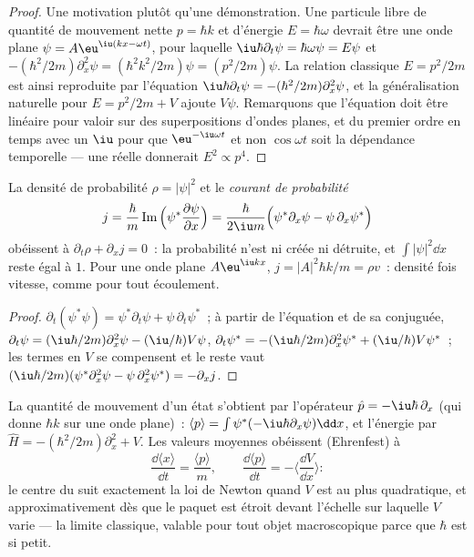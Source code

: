 \begin{proof}
Une motivation plutôt qu'une démonstration. Une particule libre de quantité de mouvement nette
$p = \hbar k$ et d'énergie $E = \hbar\omega$ devrait être une onde plane $\psi =
A\eu^{\iu(kx - \omega t)}$, pour laquelle $\iu\hbar\partial_t\psi = \hbar\omega\psi =
E\psi$ et $-(\hbar^2/2m)\partial_x^2\psi = (\hbar^2k^2/2m)\psi = (p^2/2m)\psi$.
La relation classique $E = p^2/2m$ est ainsi reproduite par l'équation
$\iu\hbar\partial_t\psi = -(\hbar^2/2m)\partial_x^2\psi$, et la généralisation
naturelle pour $E = p^2/2m + V$ ajoute $V\psi$. Remarquons que
l'équation doit être linéaire pour valoir sur des superpositions d'ondes planes, et
du premier ordre en temps avec un $\iu$ pour que $\eu^{-\iu\omega t}$ et non
$\cos\omega t$ soit la dépendance temporelle --- une  réelle
donnerait $E^2 \propto p^4$.
\end{proof}

\begin{proposition}\label{prop:b2:schrodinger-wave-functions:current}
La densité de probabilité $\rho = |\psi|^2$ et le \emph{courant de
probabilité}
\[
j = \frac{\hbar}{m}\operatorname{Im}\Big(\psi^*\frac{\partial\psi}{\partial x}\Big)
= \frac{\hbar}{2\iu m}\Big(\psi^*\partial_x\psi - \psi\,\partial_x\psi^*\Big)
\]
obéissent à $\partial_t\rho + \partial_xj = 0$~: la probabilité n'est ni créée ni
détruite, et $\int|\psi|^2\dd x$ reste égal à $1$. Pour une onde plane
$A\eu^{\iu kx}$, $j = |A|^2\hbar k/m = \rho v$~: densité fois vitesse, comme pour
tout écoulement.
\end{proposition}

\begin{proof}
$\partial_t(\psi^*\psi) = \psi^*\partial_t\psi + \psi\,\partial_t\psi^*$~; à partir de
l'équation et de sa conjuguée, $\partial_t\psi = (\iu\hbar/2m)\partial_x^2\psi -
(\iu/\hbar)V\psi$, $\partial_t\psi^* = -(\iu\hbar/2m)\partial_x^2\psi^* +
(\iu/\hbar)V\psi^*$~; les termes en $V$ se compensent et le reste vaut $(\iu\hbar/2m)(\psi^*
\partial_x^2\psi - \psi\,\partial_x^2\psi^*) = -\partial_xj$.
\end{proof}

\begin{proposition}\label{prop:b2:schrodinger-wave-functions:ehrenfest}
La quantité de mouvement d'un état s'obtient par l'opérateur $\hat p =
-\iu\hbar\,\partial_x$ (qui donne $\hbar k$ sur une onde plane)~: $\langle
p\rangle = \int\psi^*(-\iu\hbar\partial_x\psi)\dd x$, et l'énergie par $\hat H
= -(\hbar^2/2m)\partial_x^2 + V$. Les valeurs moyennes obéissent
(Ehrenfest) à
\[
\frac{\dd\langle x\rangle}{\dd t} = \frac{\langle p\rangle}{m}, \qquad
\frac{\dd\langle p\rangle}{\dd t} = -\Big\langle\frac{\dd V}{\dd x}\Big\rangle :
\]
le centre du  suit exactement la loi de Newton quand $V$ est
au plus quadratique, et approximativement dès que le paquet est étroit
devant l'échelle sur laquelle $V$ varie --- la limite classique,
valable pour tout objet macroscopique parce que $\hbar$ est si petit.
\end{proposition}

